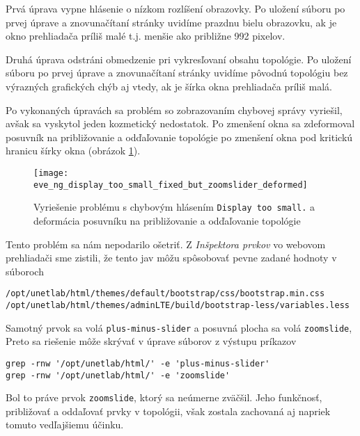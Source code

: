 Prvá úprava vypne hlásenie o nízkom rozlíšení obrazovky. Po uložení súboru po prvej úprave a znovunačítaní stránky uvidíme prazdnu bielu obrazovku, ak je okno prehliadača príliš malé t.j. menšie ako približne 992 pixelov.

Druhá úprava odstráni obmedzenie pri vykresľovaní obsahu topológie. Po uložení súboru po prvej úprave a znovunačítaní stránky uvidíme pôvodnú topológiu bez výrazných grafických chýb aj vtedy, ak je šírka okna prehliadača príliš malá.

Po vykonaných úpravách sa problém so zobrazovaním chybovej správy vyriešil, avšak sa vyskytol jeden kozmetický nedostatok. Po zmenšení okna sa zdeformoval posuvník na približovanie a odďaľovanie topológie po zmenšení okna pod kritickú hranicu šírky okna (obrázok \ref{obr:eve_ng_display_too_small_fixed_but_zoomslider_deformed}).

\begin{figure}
    \centering
    \texttt{[image: eve\_ng\_display\_too\_small\_fixed\_but\_zoomslider\_deformed]}
    \caption{Vyriešenie problému s chybovým hlásením \texttt{Display too small.} a deformácia posuvníku na približovanie a odďaľovanie topológie}
    \label{obr:eve_ng_display_too_small_fixed_but_zoomslider_deformed}
\end{figure}

Tento problém sa nám nepodarilo ošetriť. Z \emph{Inšpektora prvkov} vo webovom prehliadači sme zistili, že tento jav môžu spôsobovať pevne zadané hodnoty v súboroch
\renewcommand\baselinestretch{1}
\begin{Verbatim}[samepage=true]
/opt/unetlab/html/themes/default/bootstrap/css/bootstrap.min.css
/opt/unetlab/html/themes/adminLTE/build/bootstrap-less/variables.less
\end{Verbatim}
\renewcommand\baselinestretch{1.5}

Samotný prvok sa volá \texttt{plus-minus-slider} a posuvná plocha sa volá \texttt{zoomslide}, Preto sa riešenie môže skrývať v úprave súborov z výstupu príkazov
\renewcommand\baselinestretch{1}
\begin{Verbatim}[samepage=true]
grep -rnw '/opt/unetlab/html/' -e 'plus-minus-slider'
grep -rnw '/opt/unetlab/html/' -e 'zoomslide'
\end{Verbatim}
\renewcommand\baselinestretch{1.5}

Bol to práve prvok \texttt{zoomslide}, ktorý sa neúmerne zväčšil. Jeho funkčnosť, približovať a oddaľovať prvky v topológii, však zostala zachovaná aj napriek tomuto vedľajšiemu účinku.


